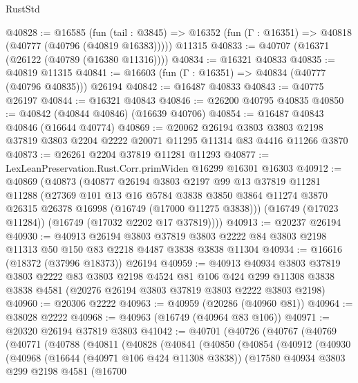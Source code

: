 \begin{lexlean}{RustStd}
\begin{coremodule}
@40828 := @16585
    (fun (tail : @3845) => @16352 (fun (Γ : @16351) => @40818 (@40777 (@40796 (@40819 @16383)))))
    @11315
@40833 := @40707 (@16371 (@26122 (@40789 (@16380 @11316))))
@40834 := @16321 @40833
@40835 := @40819 @11315
@40841 := @16603 (fun (Γ : @16351) => @40834 (@40777 (@40796 @40835))) @26194
@40842 := @16487 @40833
@40843 := @40775 @26197
@40844 := @16321 @40843
@40846 := @26200 @40795 @40835
@40850 := @40842 (@40844 @40846) (@16639 @40706)
@40854 := @16487 @40843 @40846 (@16644 @40774)
@40869 := @20062
    @26194
    @3803
    @3803
    @2198
    @37819
    @3803
    @2204
    @2222
    @20071
    @11295
    @11314
    @83
    @4416
    @11266
    @3870
@40873 := @26261 @2204 @37819 @11281 @11293
@40877 := LexLeanPreservation.Rust.Corr.primWiden @16299 @16301 @16303
@40912 := @40869
    (@40873
      (@40877
        @26194
        @3803
        @2197
        @99
        @13
        @37819
        @11281
        @11288
        (@27369
          @101
          @13
          @16
          @5784
          @3838
          @3850
          @3864
          @11274
          @3870
          @26315
          @26378
          @16998
          (@16749 (@17000 @11275 @3838)))
        (@16749 (@17023 @11284))
        (@16749 (@17032 @2202 @17 @37819))))
@40913 := @20237 @26194
@40930 := @40913
    @26194
    @3803
    @37819
    @3803
    @2222
    @84
    @3803
    @2198
    @11313
    @50
    @150
    @83
    @2218
    @4487
    @3838
    @3838
    @11304
@40934 := @16616 (@18372 (@37996 @18373)) @26194
@40959 := @40913
    @40934
    @3803
    @37819
    @3803
    @2222
    @83
    @3803
    @2198
    @4524
    @81
    @106
    @424
    @299
    @11308
    @3838
    @3838
    @4581
    (@20276 @26194 @3803 @37819 @3803 @2222 @3803 @2198)
@40960 := @20306 @2222
@40963 := @40959 (@20286 (@40960 @81))
@40964 := @38028 @2222
@40968 := @40963 (@16749 (@40964 @83 @106))
@40971 := @20320 @26194 @37819 @3803
@41042 := @40701
    (@40726
      (@40767
        (@40769
          (@40771
            (@40788
              (@40811
                (@40828
                  (@40841
                    (@40850
                      (@40854
                        (@40912
                          (@40930
                            (@40968
                              (@16644 (@40971 @106 @424 @11308 @3838))
                              (@17580
                                @40934
                                @3803
                                @299
                                @2198
                                @4581
                                (@16700

\end{coremodule}
\end{lexlean}

